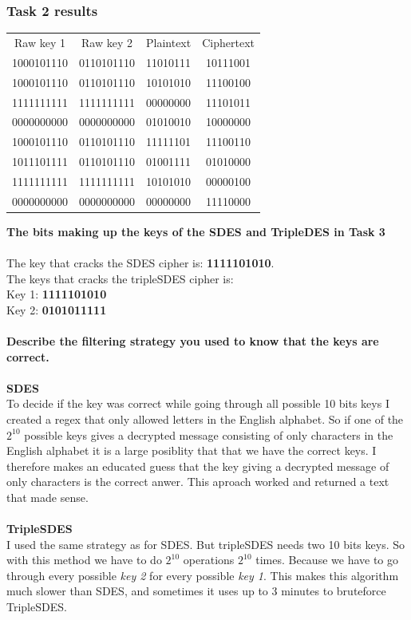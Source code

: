 \documentclass[12pt, letterpaper]{article}
\begin{document}
\subsubsection*{Task 2 results}
\begin{center}
\begin{tabular}{ |c|c|c|c| } 
 \hline
 Raw key 1 & Raw key 2 & Plaintext & Ciphertext \\
1000101110 & 0110101110 & 11010111 & 10111001 \\
1000101110 & 0110101110 & 10101010 & 11100100 \\
1111111111 & 1111111111 & 00000000 & 11101011 \\
0000000000 & 0000000000 & 01010010 & 10000000 \\
1000101110 & 0110101110 & 11111101 & 11100110 \\
1011101111 & 0110101110 & 01001111 & 01010000 \\
1111111111 & 1111111111 & 10101010 & 00000100 \\
0000000000 & 0000000000 & 00000000 & 11110000\\
 \hline
\end{tabular} 
\end{center} 

\textbf{The bits making up the keys of the SDES and TripleDES in Task 3}
\\ \\
The key that cracks the SDES cipher is: \textbf{1111101010}. \\
The keys that cracks the tripleSDES cipher is: \\ Key 1: \textbf{1111101010} \\ Key 2: \textbf{0101011111}
\\ \\
\textbf{Describe the filtering strategy you used to know that the keys are correct.}
\\ \\
\textbf{SDES} \\ 
To decide if the key was correct while going through all possible 10 bits keys I created a regex that only allowed letters in the English alphabet. So if one of the $2^{10}$ possible keys gives a decrypted message consisting of only characters in the English alphabet it is a large posiblity that that we have the correct keys. I therefore makes an educated guess that the key giving a decrypted message of only characters is the correct anwer. This aproach worked and returned a text that made sense.
\\ \\
\textbf{TripleSDES} \\
I used the same strategy as for SDES. But tripleSDES needs two 10 bits keys. So with this method we have to do $2^{10}$ operations $2^{10}$ times. Because we have to go through every possible \textit{key 2} for every possible \textit{key 1}. This makes this algorithm much slower than SDES, and sometimes it uses up to 3 minutes to bruteforce TripleSDES.
\end{document}
